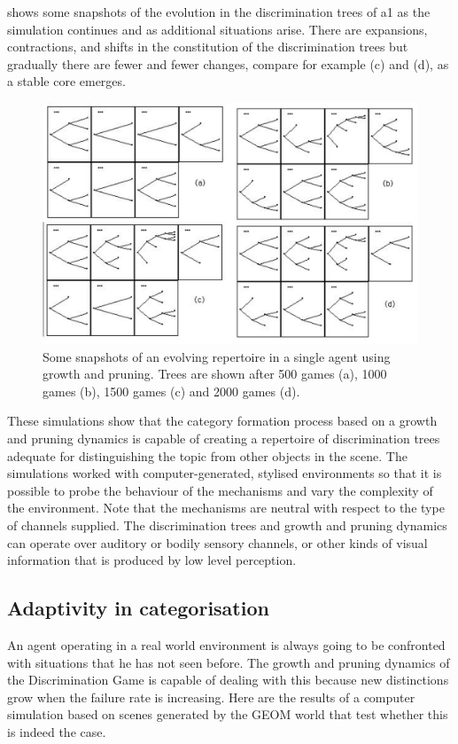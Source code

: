  shows some snapshots of the 
evolution in the discrimination trees of {\bfshape a1} as
the simulation continues and as additional situations
arise. There are
expansions, contractions, and shifts in the constitution of the 
discrimination trees but gradually there are fewer and 
fewer changes, compare for example (c) and (d), as a
stable core emerges. 

\begin{figure}[htbp]
  \centerline{\includegraphics[width=.75\textwidth]{chap4/figs/dynatrees.pdf}}
\caption{\label{dyna-trees}Some snapshots of an evolving 
repertoire in a single agent using growth and pruning. 
Trees are shown after 500 games (a), 1000 games (b), 1500 games
(c) and 2000 games (d).} 
\end{figure}

These simulations show that the
category formation process based on a growth and pruning
dynamics is capable of creating a repertoire of
discrimination trees adequate for distinguishing 
the topic from other objects in the scene. The simulations 
worked with computer-generated, stylised environments
so that it is possible to probe the behaviour of 
the mechanisms and vary the complexity of the environment. 
Note that the mechanisms are neutral with respect 
to the type of channels supplied. The discrimination 
trees and growth and pruning dynamics can operate over
auditory or bodily sensory channels, or other kinds
of visual information that is produced by low level 
perception. 

\subsection{Adaptivity in categorisation}

An agent operating in a real world environment is always
going to be confronted with situations that he has 
not seen before. The growth and pruning dynamics of the 
Discrimination Game is capable of dealing with this because 
new distinctions grow when the failure rate 
is increasing. Here are the results of a computer 
simulation based on scenes generated by the 
GEOM world that test whether this is indeed the case. 

